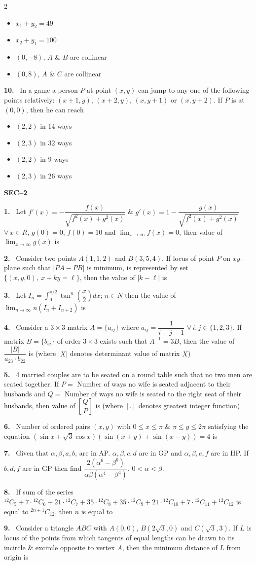 \documentclass[10pt]{extarticle}
\newcommand{\sect}[1]{\par\smallskip\noindent\textbf{#1}\par}
\newcommand{\qn}[1]{\par\smallskip\noindent\textbf{#1.}~}
\newenvironment{qoptions}{\begin{itemize}[leftmargin=1.8em,itemsep=1pt,topsep=2pt,label={}]}{\end{itemize}}
\newcommand{\opt}[2]{\item[(#1)] #2}
\begin{document}
\begin{multicols}{2}
\begin{qoptions}
\opt{A}{$x_1+y_2=49$}
\opt{B}{$x_2+y_1=100$}
\opt{C}{$(0,-8)$, $A$ \& $B$ are collinear}
\opt{D}{$(0,8)$, $A$ \& $C$ are collinear}
\end{qoptions}
\qn{10} In a game a person $P$ at point $(x,y)$ can jump to any one of the following points relatively: $(x+1,y)$, $(x+2,y)$, $(x,y+1)$ or $(x,y+2)$. If $P$ is at $(0,0)$, then he can reach
\begin{qoptions}
\opt{A}{$(2,2)$ in 14 ways}
\opt{B}{$(2,3)$ in 32 ways}
\opt{C}{$(2,2)$ in 9 ways}
\opt{D}{$(2,3)$ in 26 ways}
\end{qoptions}
\sect{SEC--2}
\qn{1} Let $f'(x)=-\dfrac{f(x)}{\sqrt{f^2(x)+g^2(x)}}$ \& $g'(x)=1-\dfrac{g(x)}{\sqrt{f^2(x)+g^2(x)}}$ $\forall\,x\in R$, $g(0)=0$, $f(0)=10$ and $\displaystyle\lim_{x\to\infty}f(x)=0$, then value of $\displaystyle\lim_{x\to\infty}g(x)$ is
\qn{2} Consider two points $A(1,1,2)$ and $B(3,5,4)$. If locus of point $P$ on $xy$--plane such that $|PA-PB|$ is minimum, is represented by set $\{(x,y,0),\ x+ky=\ell\}$, then the value of $|k-\ell|$ is
\qn{3} Let $I_n=\displaystyle\int_0^{\pi/2}\tan^n\!\left(\dfrac x2\right)dx$; $n\in N$ then the value of $\displaystyle\lim_{n\to\infty}n(I_n+I_{n+2})$ is
\qn{4} Consider a $3\times3$ matrix $A=\{a_{ij}\}$ where $a_{ij}=\dfrac1{i+j-1}$ $\forall\,i,j\in\{1,2,3\}$. If matrix $B=\{b_{ij}\}$ of order $3\times3$ exists such that $A^{-1}=3B$, then the value of $\dfrac{|B|}{a_{23}\cdot b_{22}}$ is (where $|X|$ denotes determinant value of matrix $X$)
\qn{5} 4 married couples are to be seated on a round table such that no two men are seated together. If $P=$ Number of ways no wife is seated adjacent to their husbands and $Q=$ Number of ways no wife is seated to the right seat of their husbands, then value of $\left[\dfrac QP\right]$ is (where $[.]$ denotes greatest integer function)
\qn{6} Number of ordered pairs $(x,y)$ with $0\le x\le\pi$ \& $\pi\le y\le2\pi$ satisfying the equation $(\sin x+\sqrt3\cos x)(\sin(x+y)+\sin(x-y))=4$ is
\qn{7} Given that $\alpha,\beta,a,b$, are in AP. $\alpha,\beta,c,d$ are in GP and $\alpha,\beta,e,f$ are in HP. If $b,d,f$ are in GP then find $\dfrac{2(\alpha^6-\beta^6)}{\alpha\beta(\alpha^4-\beta^4)}$, $0<\alpha<\beta$.
\qn{8} If sum of the series ${}^{12}C_5+7\cdot{}^{12}C_6+21\cdot{}^{12}C_7+35\cdot{}^{12}C_8+35\cdot{}^{12}C_9+21\cdot{}^{12}C_{10}+7\cdot{}^{12}C_{11}+{}^{12}C_{12}$ is equal to ${}^{2n+1}C_{12}$, then $n$ is equal to
\qn{9} Consider a triangle $ABC$ with $A(0,0)$, $B(2\sqrt3,0)$ and $C(\sqrt3,3)$. If $L$ is locus of the points from which tangents of equal lengths can be drawn to its incircle \& excircle opposite to vertex $A$, then the minimum distance of $L$ from origin is

\end{multicols}
\end{document}
